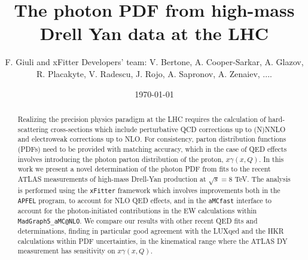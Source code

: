 \documentclass[english,aps]{revtex4-1}
\begin{document}
\linenumbers

\title{The photon PDF from high-mass Drell Yan data at the LHC}

\author{F. Giuli and xFitter Developers' team: V. Bertone, A. Cooper-Sarkar, A. Glazov, R. Placakyte, V. Radescu,  J. Rojo, A. Sapronov, A. Zenaiev, .... }

\date{\today}
\begin{abstract}
  Realizing the precision physics paradigm at the LHC requires the
  calculation of hard-scattering cross-sections which include
  perturbative QCD corrections up to (N)NNLO and electroweak
  corrections up to NLO.
  For consistency, parton distribution functions (PDFs) need to be
  provided with matching accuracy, which in the case of QED effects
  involves introducing the photon parton distribution of the proton,
  $x\gamma(x,Q)$.
  In this work we present a novel determination of the photon PDF from
  fits to the recent ATLAS measurements of high-mass Drell-Yan
  production at $\sqrt{s}=8$ TeV.
  The analysis is performed using the {\tt xFitter} framework which
  involves improvements both in the {\tt APFEL} program, to account
  for NLO QED effects, and in the {\tt aMCfast} interface to account
  for the photon-initiated contributions in the EW calculations within
  {\tt MadGraph5\_aMC@NLO}.
  We compare our results with other recent QED fits and
  determinations, finding in particular good agreement with the LUXqed
  and the HKR calculations within PDF uncertainties, in the
  kinematical range where the ATLAS DY measurement has sensitivity on
  $x\gamma(x,Q)$.
\end{abstract}
\maketitle

\tableofcontents{}












\end{document}
